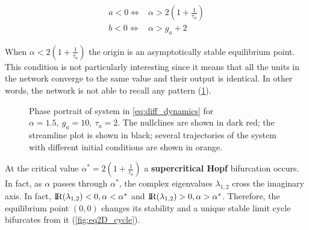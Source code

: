 \begin{equation}
\begin{aligned}
 a < 0 \iff & \alpha > 2\left(1 + \frac{1}{\tau_a}\right) \\
 b < 0 \iff & \alpha > g_a + 2
\end{aligned}
\end{equation}

When $\alpha<2(1+\frac{1}{\tau_a})$ the origin is an asymptotically stable equilibrium point. This condition is not particularly interesting since it means that all the units in the network converge to the same value and their output is identical. In other words, the network is not able to recall any pattern (\cref{fig:eq2D_focus}).

\begin{figure}[H]
        \caption{\label{fig:eq2D_focus} Phase portrait of system in \eqref{eq:diff_dynamics} for $\alpha=1.5,\ g_a=10,\ \tau_a=2$. The nullclines are shown in dark red; the streamline plot is shown in black; several trajectories of the system with different initial conditions are shown in orange.}
\end{figure}


At the critical value $\alpha^* = 2 ( 1 + \frac{1}{\tau_a} ) $ a \textbf{supercritical Hopf} bifurcation occurs. In fact, as $\alpha$ passes through $\alpha^*$, the complex eigenvalues $\lambda_{1,2}$ cross the imaginary axis. In fact, ${\rm I\!R}(\lambda_{1,2})<0, \alpha < \alpha^*$ and  ${\rm I\!R}(\lambda_{1,2})>0, \alpha > \alpha^*$. Therefore, the equilibrium point $(0, 0)$ changes its stability and a unique stable limit cycle bifurcates from it (\cref{fig:eq2D_cycle}).


